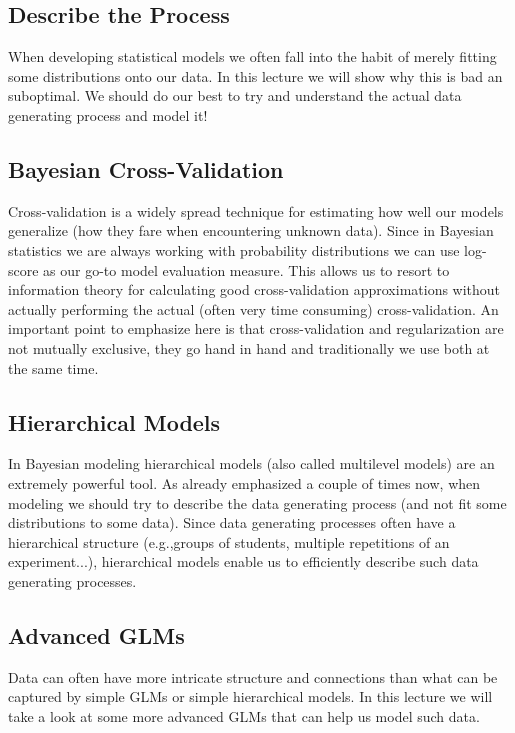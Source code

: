 \documentclass[fleqn,moreauthors,10pt]{ds_report}
\begin{document}
\subsection*{Describe the Process}

When developing statistical models we often fall into the habit of merely fitting some distributions onto our data. In this lecture we will show why this is bad an suboptimal. We should do our best to try and understand the actual data generating process and model it!

\subsection*{Bayesian Cross-Validation}

Cross-validation is a widely spread technique for estimating how well our models generalize (how they fare when encountering unknown data). Since in Bayesian statistics we are always working with probability distributions we can use log-score as our go-to model evaluation measure. This allows us to resort to information theory for calculating good cross-validation approximations without actually performing the actual (often very time consuming) cross-validation. An important point to emphasize here is that cross-validation and regularization are not mutually exclusive, they go hand in hand and traditionally we use both at the same time.

\subsection*{Hierarchical Models}

In Bayesian modeling hierarchical models (also called multilevel models) are an extremely powerful tool. As already emphasized a couple of times now, when modeling we should try to describe the data generating process (and not fit some distributions to some data). Since data generating processes often have a hierarchical structure (e.g.,groups of students, multiple repetitions of an experiment...), hierarchical models enable us to efficiently describe such data generating processes.

\subsection*{Advanced GLMs}

Data can often have more intricate structure and connections than what can be captured by simple GLMs or simple hierarchical models. In this lecture we will take a look at some more advanced GLMs that can help us model such data.
\end{document}
